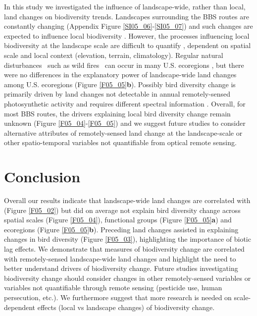 In this study we investigated the influence of landscape-wide, rather than local, land changes on biodiversity trends. Landscapes surrounding the BBS routes are constantly changing (Appendix Figure \ref{SI05_06}-\ref{SI05_07}) and such changes are expected to influence local biodiversity \citep{Manning2009,Turner2015,Seppelt2016}. However, the processes influencing local biodiversity at the landscape scale are difficult to quantify \citep{Chase2003}, dependent on spatial scale \citep{Miguet2015} and local context (elevation, terrain, climatology). Regular natural disturbances \textendash\ such as wild fires \textendash\ can occur in many U.S. ecoregions \citep{Morgan2001}, but there were no differences in the explanatory power of landscape-wide land changes among U.S. ecoregions (Figure \ref{F05_05}\textbf{b}). Possibly bird diversity change is primarily driven by land changes not detectable in annual remotely-sensed photosynthetic activity and requires different spectral information \citep{Zhu2014}. Overall, for most BBS routes, the drivers explaining local bird diversity change remain unknown (Figure \ref{F05_04}-\ref{F05_05}) and we suggest future studies to consider alternative attributes of remotely-sensed land change at the landscape-scale \citep{Watson2014} or other spatio-temporal variables not quantifiable from optical remote sensing.

\section{Conclusion}
\label{C05_05}

Overall our results indicate that landscape-wide land changes are correlated with (Figure \ref{F05_02}) but did on average not explain bird diversity change across spatial scales (Figure \ref{F05_04}), functional groups (Figure \ref{F05_05}\textbf{a}) and ecoregions (Figure \ref{F05_05}\textbf{b}). Preceding land changes assisted in explaining changes in bird diversity (Figure \ref{F05_03}), highlighting the importance of biotic lag effects. We demonstrate that measures of biodiversity change are correlated with remotely-sensed landscape-wide land changes and highlight the need to better understand drivers of biodiversity change. Future studies investigating biodiversity change should consider changes in other remotely-sensed variables or variables not quantifiable through remote sensing (\eg pesticide use, human persecution, etc.). We furthermore suggest that more research is needed on scale-dependent effects (local vs landscape changes) of biodiversity change. 

